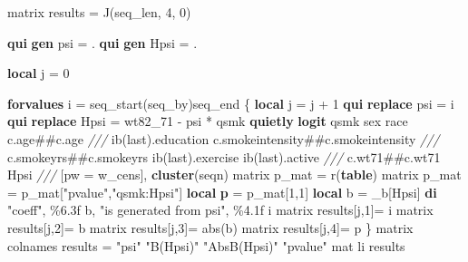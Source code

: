 \documentclass[
  10pt,
]{book}
\newenvironment{Shaded}{\begin{snugshade}}{\end{snugshade}}
\newcommand{\CommentTok}[1]{\textcolor[rgb]{0.56,0.35,0.01}{\textit{#1}}}
\newcommand{\FunctionTok}[1]{\textcolor[rgb]{0.00,0.00,0.00}{#1}}
\newcommand{\KeywordTok}[1]{\textcolor[rgb]{0.13,0.29,0.53}{\textbf{#1}}}
\newcommand{\NormalTok}[1]{#1}
\newcommand{\OtherTok}[1]{\textcolor[rgb]{0.56,0.35,0.01}{#1}}
\newcommand{\StringTok}[1]{\textcolor[rgb]{0.31,0.60,0.02}{#1}}
\begin{document}
\begin{Shaded}
\begin{Highlighting}[]
\FunctionTok{matrix}\NormalTok{ results = }\FunctionTok{J}\NormalTok{(}\OtherTok{\textasciigrave{}seq\_len\textquotesingle{}}\NormalTok{, 4, 0)}

\KeywordTok{qui} \KeywordTok{gen}\NormalTok{ psi = .}
\KeywordTok{qui} \KeywordTok{gen}\NormalTok{ Hpsi = .}

\KeywordTok{local}\NormalTok{ j = 0}

\KeywordTok{forvalues}\NormalTok{ i =  }\OtherTok{\textasciigrave{}seq\_start\textquotesingle{}}\NormalTok{(}\OtherTok{\textasciigrave{}seq\_by\textquotesingle{}}\NormalTok{)}\OtherTok{\textasciigrave{}seq\_end\textquotesingle{}}\NormalTok{ \{}
    \KeywordTok{local}\NormalTok{ j = }\OtherTok{\textasciigrave{}j\textquotesingle{}}\NormalTok{ + 1}
    \KeywordTok{qui} \KeywordTok{replace}\NormalTok{ psi = }\OtherTok{\textasciigrave{}i\textquotesingle{}}
    \KeywordTok{qui} \KeywordTok{replace}\NormalTok{ Hpsi = wt82\_71 {-} psi * qsmk }
    \KeywordTok{quietly} \KeywordTok{logit}\NormalTok{ qsmk sex race c.age\#\#c.age }\CommentTok{///}
\NormalTok{      ib(}\FunctionTok{last}\NormalTok{).education c.smokeintensity\#\#c.smokeintensity }\CommentTok{///}
\NormalTok{      c.smokeyrs\#\#c.smokeyrs ib(}\FunctionTok{last}\NormalTok{).exercise ib(}\FunctionTok{last}\NormalTok{).active }\CommentTok{///}
\NormalTok{      c.wt71\#\#c.wt71 Hpsi }\CommentTok{///}
\NormalTok{      [pw = w\_cens], }\KeywordTok{cluster}\NormalTok{(seqn)}
    \FunctionTok{matrix}\NormalTok{ p\_mat = }\FunctionTok{r}\NormalTok{(}\KeywordTok{table}\NormalTok{)}
    \FunctionTok{matrix}\NormalTok{ p\_mat = p\_mat[}\StringTok{"pvalue"}\NormalTok{,}\StringTok{"qsmk:Hpsi"}\NormalTok{]}
    \KeywordTok{local} \KeywordTok{p}\NormalTok{ = p\_mat[1,1]}
    \KeywordTok{local}\NormalTok{ b = \_b[Hpsi]}
    \KeywordTok{di} \StringTok{"coeff"}\NormalTok{, \%6.3f }\OtherTok{\textasciigrave{}b\textquotesingle{}}\NormalTok{, }\StringTok{"is generated from psi"}\NormalTok{, \%4.1f }\OtherTok{\textasciigrave{}i\textquotesingle{}}
    \FunctionTok{matrix}\NormalTok{ results[}\OtherTok{\textasciigrave{}j\textquotesingle{}}\NormalTok{,1]= }\OtherTok{\textasciigrave{}i\textquotesingle{}}
    \FunctionTok{matrix}\NormalTok{ results[}\OtherTok{\textasciigrave{}j\textquotesingle{}}\NormalTok{,2]= }\OtherTok{\textasciigrave{}b\textquotesingle{}}
    \FunctionTok{matrix}\NormalTok{ results[}\OtherTok{\textasciigrave{}j\textquotesingle{}}\NormalTok{,3]= }\FunctionTok{abs}\NormalTok{(}\OtherTok{\textasciigrave{}b\textquotesingle{}}\NormalTok{)}
    \FunctionTok{matrix}\NormalTok{ results[}\OtherTok{\textasciigrave{}j\textquotesingle{}}\NormalTok{,4]= }\OtherTok{\textasciigrave{}p\textquotesingle{}}
\NormalTok{\}}
\FunctionTok{matrix} \OtherTok{colnames}\NormalTok{ results = }\StringTok{"psi"} \StringTok{"B(Hpsi)"} \StringTok{"AbsB(Hpsi)"} \StringTok{"pvalue"}
\NormalTok{mat li results }


\end{Highlighting}
\end{Shaded}
\end{document}
